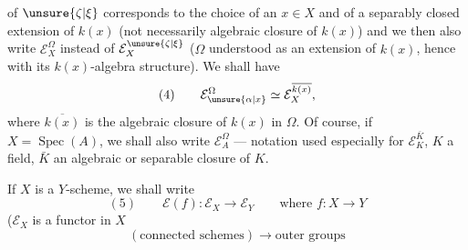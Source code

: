 of $\unsure{\zeta|\xi}$ corresponds to the choice of an $x\in X$ and of a separably closed extension  \inserted{$\Omega$} of $k(x)$ (not necessarily  algebraic closure of $k(x)$) and we then also write $\mathcal E_X^\Omega$ instead of $\mathcal E_X^{\unsure{\zeta|\xi}}$ ($\Omega$ understood as an extension of $k(x)$, hence with its $k(x)$-algebra structure). We shall have 
\[
(4)\qquad \mathcal E_{\unsure{\alpha|x}}^\Omega\simeq\mathcal E_X^{\overline{k(x)}},
\]
where $\overline{k(x)}$ is the algebraic closure of $k(x)$ in $\Omega$. Of course, if $X=\operatorname{Spec}(A)$, we shall also write $\mathcal E_A^\Omega$ --- notation used especially for $\mathcal E_K^{\bar K}$, $K$ a field, $\bar K$ an algebraic or separable closure of $K$.

If $X$ is a $Y$-scheme,  we shall write
\[
(5)\qquad \mathcal E(f):\mathcal E_X\longrightarrow\mathcal E_Y\qquad\text{where }f:X\longrightarrow Y
\]
($\mathcal E_X$ is a functor in $X$
\[
(\text{connected schemes})\longrightarrow\text{outer groups}
\]
